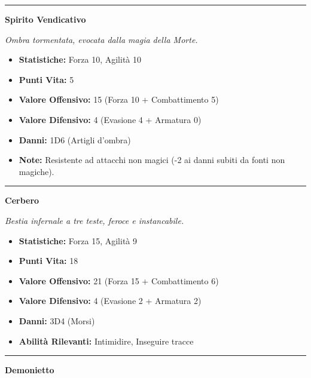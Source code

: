 \documentclass[../manuale_main.tex]{subfiles}
\begin{document}
\vspace{0.2cm}
\noindent
\begin{center}
\rule{\textwidth}{0.4pt} 
\end{center}
\vspace{0.2cm}

\vspace{0.2cm}
{\zarafirtitlefont\Large\bfseries\noindent Spirito Vendicativo}
\vspace{0.2cm}



\textit{Ombra tormentata, evocata dalla magia della Morte.}
\begin{itemize}
\item \textbf{Statistiche:} Forza 10, Agilità 10
\item \textbf{Punti Vita:} 5
\item \textbf{Valore Offensivo:} 15 (Forza 10 + Combattimento 5)
\item \textbf{Valore Difensivo:} 4 (Evasione 4 + Armatura 0)
\item \textbf{Danni:} 1D6 (Artigli d'ombra)
\item \textbf{Note:} Resistente ad attacchi non magici (-2 ai danni subiti da fonti non magiche).
\end{itemize}
\vspace{0.2cm}
\noindent
\begin{center}
\rule{\textwidth}{0.4pt} 
\end{center}
\vspace{0.2cm}
{\zarafirtitlefont\Large\bfseries\noindent Cerbero}
\vspace{0.2cm}



\textit{Bestia infernale a tre teste, feroce e instancabile.}
\begin{itemize}
\item \textbf{Statistiche:} Forza 15, Agilità 9
\item \textbf{Punti Vita:} 18
\item \textbf{Valore Offensivo:} 21 (Forza 15 + Combattimento 6)
\item \textbf{Valore Difensivo:} 4 (Evasione 2 + Armatura 2)
\item \textbf{Danni:} 3D4 (Morsi)
\item \textbf{Abilità Rilevanti:} Intimidire, Inseguire tracce
\end{itemize}
\vspace{0.2cm}
\noindent
\begin{center}
\rule{\textwidth}{0.4pt} 
\end{center}
\clearpage
{\zarafirtitlefont\Large\bfseries\noindent Demonietto}
\vspace{0.2cm}
\end{document}
